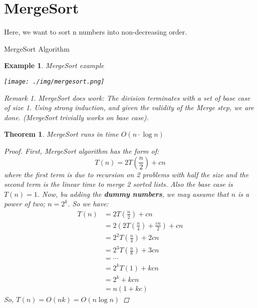 \documentclass[11pt, a4paper, oneside]{book}
\DeclarePairedDelimiter\floor{\lfloor}{\rfloor}
\theoremstyle{theoremdd}
\newtheorem{theorem}{Theorem}[chapter]
\newtheorem{example}{Example}[chapter]
\theoremstyle{remark}
\newtheorem*{remark}{Remark}
\begin{document}
\section{MergeSort}
Here, we want to sort n numbers into non-decreasing order. \\
\begin{algorithm}[H]
\SetAlgoLined
{}
 \caption{MergeSort Algorithm}
\end{algorithm}

\begin{example}
MergeSort example
\begin{center}
\texttt{[image: ./img/mergesort.png]}
\end{center}
\begin{remark}
MergeSort does work: The division terminates with a set of base case of size 1. Using strong induction, and given the validity of the Merge step, we are done. (MergeSort trivially works on base case).
\end{remark}
\end{example}

\begin{theorem}
MergeSort runs in time $O(n\cdot \log n)$
\begin{proof}
First, MergeSort algorithm has the form of: 
\begin{equation*}
T(n) = 2T(\frac{n}{2}) + cn
\end{equation*}
where the first term is due to recursion on 2 problems with half the size and the second term is the linear time to merge 2 sorted lists. Also the base case is $T(n)=1$. Now, bu adding the \textbf{dummy numbers}, we may assume that $n$ is a power of two; $n=2^k$. So we have:
\begin{align*} 
T(n) & = 2T(\frac{n}{2}) + cn \\& 
       = 2(2T(\frac{n}{4})+\frac{cn}{2})+cn \\&
       = 2^2T(\frac{n}{4}) + 2cn \\&
       = 2^3T(\frac{n}{8}) + 3cn \\&
       = \cdots \\&
       = 2^kT(1) + kcn \\&
       = 2^k + kcn \\&
       = n(1+kc)
\end{align*}
So, $T(n) = O(nk) = O(n\log n)$
\end{proof}
\end{theorem}
\end{document}
